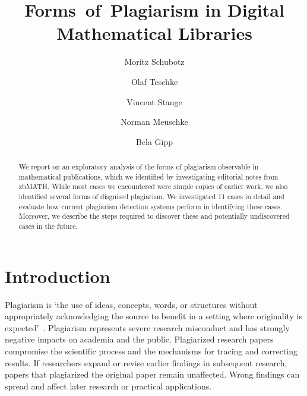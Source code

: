 \documentclass{llncs}
\begin{document}
\mainmatter

\title{Forms~of~Plagiarism in Digital Mathematical Libraries}

\author{Moritz Schubotz \and Olaf Teschke \and  Vincent Stange   \and Norman Meuschke \and Bela Gipp}


\maketitle
\ifdefined\theReferenceText
\thispagestyle{firststyle}
\fi

\begin{abstract}
We report on an exploratory analysis of the forms of plagiarism observable in mathematical publications, which we identified by investigating editorial notes from zbMATH.
While most cases we encountered were simple copies of earlier work, we also identified several forms of disguised plagiarism.
We investigated 11 cases in detail and evaluate how current plagiarism detection systems perform in identifying these cases.
Moreover, we describe the steps required to discover these and potentially undiscovered cases in the future.
\end{abstract}

\section{Introduction}\label{sec.intro}
Plagiarism is `the use of ideas, concepts, words, or structures without appropriately acknowledging the source to benefit in a setting where originality is expected'~\cite{Fishman09,Gipp2014}. Plagiarism represents severe research misconduct and has strongly negative impacts on academia and the public. Plagiarized research papers compromise the scientific process and the mechanisms for tracing and correcting results. If researchers expand or revise earlier findings in subsequent research, papers that plagiarized the original paper remain unaffected. Wrong findings can spread and affect later research or practical applications.
\end{document}
